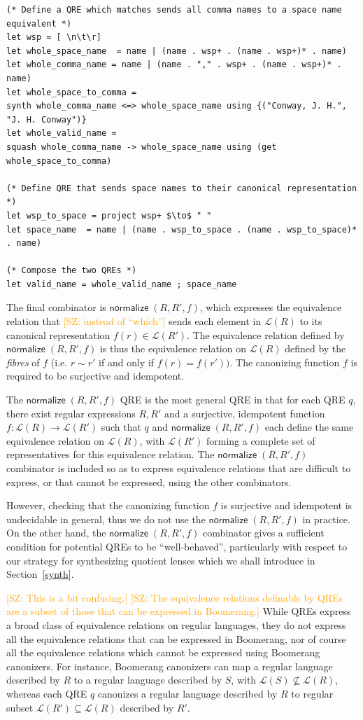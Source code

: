 \documentclass{svproc}
\newcommand{\FINISH}[3]{\ifdraft\textcolor{#1}{[#2: #3]}\fi}
\newcommand{\saz}[1]{\FINISH{orange}{SZ}{#1}}
\newcommand{\kw}[1]{\ensuremath{\mathsf{#1}}}
\newcommand{\normalize}[3]{\ensuremath{\kw{normalize} \; (#1, #2, #3)}}
\begin{document}
\begin{lstlisting}
(* Define a QRE which matches sends all comma names to a space name equivalent *)
let wsp = [ \n\t\r] 
let whole_space_name  = name | (name . wsp+ . (name . wsp+)* . name) 
let whole_comma_name = name | (name . "," . wsp+ . (name . wsp+)* . name) 
let whole_space_to_comma = 
synth whole_comma_name <=> whole_space_name using {("Conway, J. H.", "J. H. Conway")} 
let whole_valid_name = 
squash whole_comma_name -> whole_space_name using (get whole_space_to_comma)

(* Define QRE that sends space names to their canonical representation *)
let wsp_to_space = project wsp+ $\to$ " "
let space_name  = name | (name . wsp_to_space . (name . wsp_to_space)* . name)

(* Compose the two QREs *)
let valid_name = whole_valid_name ; space_name
\end{lstlisting}

The final combinator is  $\normalize{R}{R'}{f}$, which expresses
the equivalence relation that \saz{instead of ``which''} sends each element in $\mathcal{L}(R)$ to its
canonical representation $f(r) \in \mathcal{L}(R')$. The equivalence relation
defined by $\normalize{R}{R'}{f}$ is thus the equivalence relation on
$\mathcal{L}(R)$ defined by the {\em fibres} of $f$ (i.e. $r \sim r'$ if and
only if $f(r) = f(r'))$. The canonizing function $f$ is required to be
surjective and idempotent.

The $\normalize{R}{R'}{f}$ QRE is the most general QRE in that for each QRE
$q$, there exist regular expressions $R, R'$ and a surjective, idempotent
function $f:\mathcal{L}(R) \longrightarrow \mathcal{L}(R')$ such that $q$ and
$\normalize{R}{R'}{f}$ each define the same equivalence relation on
$\mathcal{L}(R)$, with $\mathcal{L}(R')$ forming a complete set of
representatives for this equivalence relation. The $\normalize{R}{R'}{f}$
combinator is included so as to express equivalence relations that are
difficult to express, or that cannot be expressed, using the other
combinators.

However, checking that the canonizing function $f$ is
surjective and idempotent is undecidable in general, thus we do not use the
$\normalize{R}{R'}{f}$ in practice. On the other hand, the
$\normalize{R}{R'}{f}$ combinator gives a sufficient condition for potential
QREs to be ``well-behaved'', particularly with respect to our strategy for
synthesizing quotient lenses which we shall introduce in Section~\ref{synth}.

\saz{This is a bit confusing.} \saz{The equivalence relations definable by
  QREs are a subset of those that can be expressed in Boomerang.} 
While QREs express a broad class of equivalence relations on regular languages,
they do not express all the equivalence relations that can be expressed in
Boomerang, nor of course all the equivalence relations which cannot be
expressed using Boomerang canonizers. For instance, Boomerang canonizers can
map a regular language described by $R$ to a regular language described by
$S$, with $\mathcal{L}(S) \not \subseteq \mathcal{L}(R)$, whereas each QRE $q$
canonizes a regular language described by $R$ to regular subset
$\mathcal{L}(R') \subseteq \mathcal{L}(R)$ described by $R'$.
\end{document}
